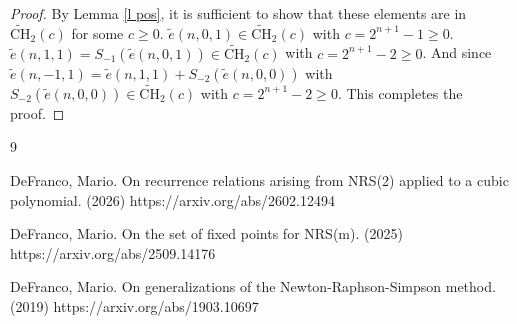 \documentclass[11pt, oneside]{article}   	%
\newcommand{\tCH}{\tilde{\mathrm{CH}}_2}
\newcommand{\te}{\tilde{e}}
\begin{document}
\begin{proof}
By Lemma \ref{l pos}, it is sufficient to show that these elements are in $\tCH(c)$ for some $c \geq 0$. $\te(n,0,1) \in \tCH(c)$ with $c = 2^{n+1}-1 \geq 0$. $\te(n,1,1) = S_{-1}(\te(n,0,1)) \in \tCH(c)$ with $c = 2^{n+1}-2\geq0$. And since $\te(n,-1,1) = \te(n,1,1)+ S_{-2}(\te(n,0,0))$ with $S_{-2}(\te(n,0,0)) \in \tCH(c)$ with $c =2^{n+1}-2 \geq 0$. This completes the proof. 
\end{proof}

\begin{thebibliography}{9}

 DeFranco, Mario. On recurrence relations arising from NRS(2) applied to a cubic polynomial. (2026) https://arxiv.org/abs/2602.12494

 DeFranco, Mario. On the set of fixed points for NRS(m). (2025) https://arxiv.org/abs/2509.14176

 DeFranco, Mario. On generalizations of the Newton-Raphson-Simpson method. (2019) https://arxiv.org/abs/1903.10697

\end{thebibliography}
\end{document}

